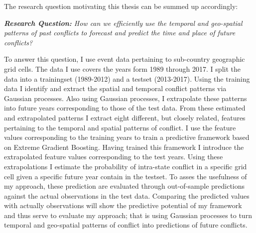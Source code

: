 \documentclass[a4paper]{article}
\begin{document}
The research question motivating this thesis can be summed up accordingly:\par

\begin{displayquote}

\emph{\textbf{Research Question:} How can we efficiently use the temporal and geo-spatial patterns of past conflicts to forecast and predict the time and place of future conflicts?}\par

\end{displayquote}


To answer this question, I use event data pertaining to sub-country geographic grid cells. The data I use covers the years form 1989 through 2017. I split the data into a trainingset (1989-2012) and a testset (2013-2017). Using the training data I identify and extract the spatial and temporal conflict patterns via Gaussian processes. Also using Gaussian processes, I extrapolate these patterns into future years corresponding to those of the test data. From these estimated and extrapolated patterns I extract eight different, but closely related, features pertaining to the temporal and spatial patterns of conflict. I use the feature values corresponding to the training years to train a predictive framework based on Extreme Gradient Boosting. Having trained this framework I introduce the extrapolated feature values corresponding to the test years. Using these extrapolations I estimate the probability of intra-state conflict in a specific grid cell given a specific future year contain in the testset. To asses the usefulness of my approach, these prediction are evaluated through out-of-sample predictions against the actual observations in the test data. Comparing the predicted values with actually observations will show the predictive potential of my framework and thus serve to evaluate my approach; that is using Gaussian processes to turn temporal and geo-spatial patterns of conflict into predictions of future conflicts.\par
\end{document}
